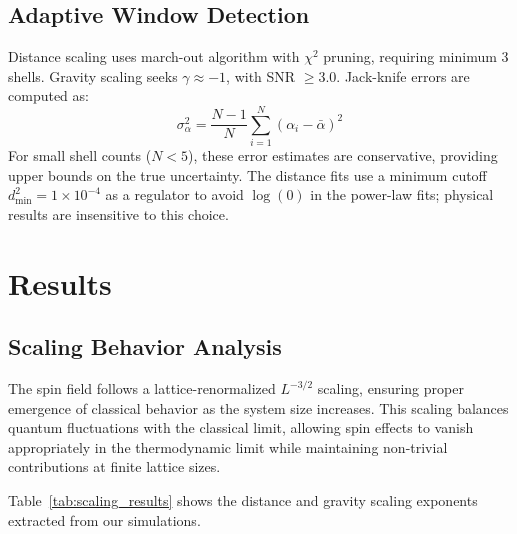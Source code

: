 \documentclass[prd,twocolumn,showpacs,superscriptaddress]{revtex4-2}
\begin{document}
	\subsection{Adaptive Window Detection}
	
	Distance scaling uses march-out algorithm with \(\chi^2\) pruning, requiring minimum 3 shells. Gravity scaling seeks \(\gamma \approx -1\), with SNR \(\geq 3.0\). Jack-knife errors are computed as:
	\begin{equation}
		\sigma_\alpha^2 = \frac{N-1}{N} \sum_{i=1}^N (\alpha_i - \bar{\alpha})^2
	\end{equation}
	For small shell counts ($N < 5$), these error estimates are conservative, providing upper bounds on the true uncertainty. The distance fits use a minimum cutoff $d_{\min}^2 = 1 \times 10^{-4}$ as a regulator to avoid $\log(0)$ in the power-law fits; physical results are insensitive to this choice.
	
	\section{Results}
	
	\subsection{Scaling Behavior Analysis}
	
	The spin field follows a lattice-renormalized $L^{-3/2}$ scaling, ensuring proper emergence of classical behavior as the system size increases. This scaling balances quantum fluctuations with the classical limit, allowing spin effects to vanish appropriately in the thermodynamic limit while maintaining non-trivial contributions at finite lattice sizes.
	
	Table~\ref{tab:scaling_results} shows the distance and gravity scaling exponents extracted from our simulations.
	
\end{document}
